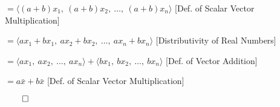 \begin{proofbox}
\begin{enumerate}[label=\arabic*., resume=vecprops]
\quad $= \langle (a + b)x_1,\ (a + b)x_2,\ \ldots,\ (a + b)x_n \rangle$ \hfill [Def. of Scalar Vector Multiplication]

\quad $= \langle ax_1 + bx_1,\ ax_2 + bx_2,\ \ldots,\ ax_n + bx_n \rangle$ \hfill [Distributivity of Real Numbers]

\quad $= \langle ax_1,\ ax_2,\ \ldots,\ ax_n \rangle + \langle bx_1,\ bx_2,\ \ldots,\ bx_n \rangle$ \hfill [Def. of Vector Addition]

\quad $= a\bar{x} + b\bar{x}$ \hfill [Def. of Scalar Vector Multiplication]

\hfill $\qed$

\end{enumerate}
\end{proofbox}
